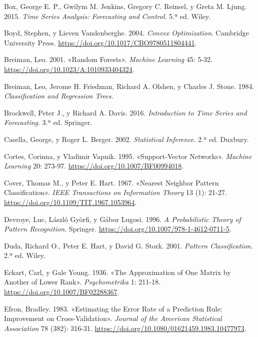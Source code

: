 \documentclass[
  spanish,
  10.5pt,
  letterpaper,
  DIV=11,
  numbers=noendperiod,
  oneside,
  open=any]{scrreprt}
\newlength{\cslhangindent}
\newenvironment{CSLReferences}[2] %
 {\begin{list}{}{%
  \setlength{\itemindent}{0pt}
  \setlength{\leftmargin}{0pt}
  \setlength{\parsep}{0pt}
  \ifodd #1
   \setlength{\leftmargin}{\cslhangindent}
   \setlength{\itemindent}{-1\cslhangindent}
  \fi
  \setlength{\itemsep}{#2\baselineskip}}}
 {\end{list}}
\theoremstyle{definition}
\theoremstyle{definition}
\theoremstyle{plain}
\theoremstyle{remark}
\begin{document}
\begin{CSLReferences}{1}{1}
Box, George E. P., Gwilym M. Jenkins, Gregory C. Reinsel, y Greta M.
Ljung. 2015. \emph{Time Series Analysis: Forecasting and Control}. 5.ª
ed. Wiley.

Boyd, Stephen, y Lieven Vandenberghe. 2004. \emph{Convex Optimization}.
Cambridge University Press.
\url{https://doi.org/10.1017/CBO9780511804441}.

Breiman, Leo. 2001. {«Random Forests»}. \emph{Machine Learning} 45:
5-32. \url{https://doi.org/10.1023/A:1010933404324}.

Breiman, Leo, Jerome H. Friedman, Richard A. Olshen, y Charles J. Stone.
1984. \emph{Classification and Regression Trees}.

Brockwell, Peter J., y Richard A. Davis. 2016. \emph{Introduction to
Time Series and Forecasting}. 3.ª ed. Springer.

Casella, George, y Roger L. Berger. 2002. \emph{Statistical Inference}.
2.ª ed. Duxbury.

Cortes, Corinna, y Vladimir Vapnik. 1995. {«Support-Vector Networks»}.
\emph{Machine Learning} 20: 273-97.
\url{https://doi.org/10.1007/BF00994018}.

Cover, Thomas M., y Peter E. Hart. 1967. {«Nearest Neighbor Pattern
Classification»}. \emph{IEEE Transactions on Information Theory} 13 (1):
21-27. \url{https://doi.org/10.1109/TIT.1967.1053964}.

Devroye, Luc, László Györfi, y Gábor Lugosi. 1996. \emph{A Probabilistic
Theory of Pattern Recognition}. Springer.
\url{https://doi.org/10.1007/978-1-4612-0711-5}.

Duda, Richard O., Peter E. Hart, y David G. Stork. 2001. \emph{Pattern
Classification}. 2.ª ed. Wiley.

Eckart, Carl, y Gale Young. 1936. {«The Approximation of One Matrix by
Another of Lower Rank»}. \emph{Psychometrika} 1: 211-18.
\url{https://doi.org/10.1007/BF02288367}.

Efron, Bradley. 1983. {«Estimating the Error Rate of a Prediction Rule:
Improvement on Cross-Validation»}. \emph{Journal of the American
Statistical Association} 78 (382): 316-31.
\url{https://doi.org/10.1080/01621459.1983.10477973}.


\end{CSLReferences}
\end{document}
